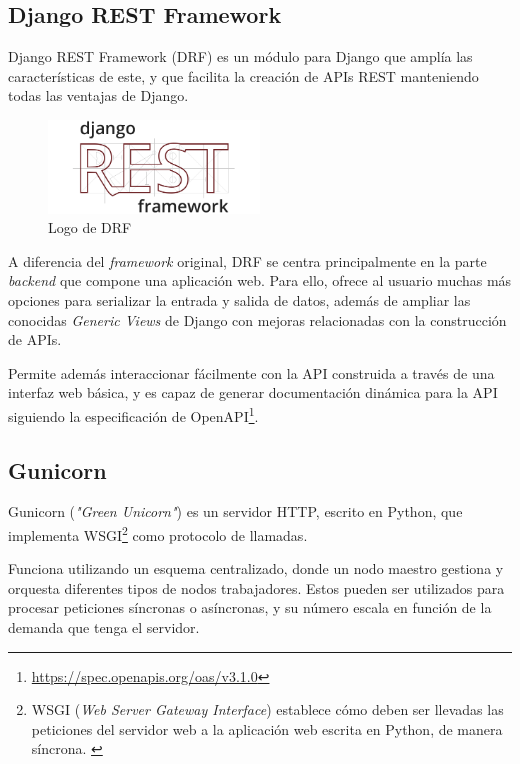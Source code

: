 \subsection{Django REST Framework}\label{sec:drf}

Django REST Framework (DRF) es un módulo para Django que amplía las características de este, y que facilita la creación de APIs REST manteniendo todas las ventajas de Django. \emph{\parencite{Reference7}}

\begin{figure}[ht]
    \centering
    \includegraphics[width=0.5\textwidth]{Figures/drf-logo}
    \decoRule
    \caption[DRF (Logo)]{Logo de DRF \emph{\parencite{Reference8}}}
    \label{fig:drf-logo}
\end{figure}

A diferencia del \emph{framework} original, DRF se centra principalmente en la parte \emph{backend} que compone una aplicación web. Para ello, ofrece al usuario muchas más opciones para serializar la entrada y salida de datos, además de ampliar las conocidas \emph{Generic Views} de Django con mejoras relacionadas con la construcción de APIs. \emph{\parencite{Reference7}}

Permite además interaccionar fácilmente con la API construida a través de una interfaz web básica, y es capaz de generar documentación dinámica para la API siguiendo la especificación de OpenAPI\footnote{\url{https://spec.openapis.org/oas/v3.1.0}}. \emph{\parencite{Reference7}}

\subsection{Gunicorn}\label{sec:gunicorn}

Gunicorn (\emph{"Green Unicorn"}) es un servidor HTTP, escrito en Python, que implementa WSGI\footnote{WSGI (\emph{Web Server Gateway Interface}) establece cómo deben ser llevadas las peticiones del servidor web a la aplicación web escrita en Python, de manera síncrona. \emph{\parencite{Reference11}}} como protocolo de llamadas.

Funciona utilizando un esquema centralizado, donde un nodo maestro gestiona y orquesta diferentes tipos de nodos trabajadores. Estos pueden ser utilizados para procesar peticiones síncronas o asíncronas, y su número escala en función de la demanda que tenga el servidor. \emph{\parencite{Reference9}}

